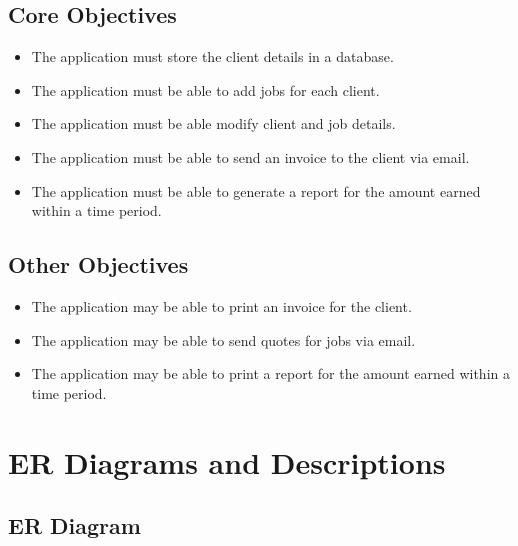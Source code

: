 \subsection{Core Objectives}
	
	\begin{itemize}
		\item The application must store the client details in a database.
		\item The application must be able to add jobs for each client.
		\item The application must be able  modify client and job details.
		\item The application must be able to send an invoice to the client via email.
		\item The application must be able to generate a report for the amount earned within a time period.
	\end{itemize}


\subsection{Other Objectives}

	\begin{itemize}
		\item The application may be able to print an invoice for the client.
		\item The application may be able to send quotes for jobs via email.
		\item The application may be able to print a report for the amount earned within a time period.
	
	\end{itemize}



\section{ER Diagrams and Descriptions}

\subsection{ER Diagram}

